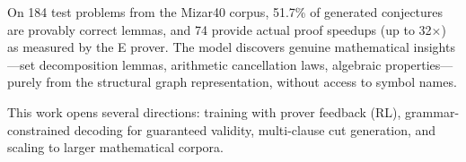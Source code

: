 \documentclass{article}
\begin{document}
On 184 test problems from the Mizar40 corpus, 51.7\% of generated conjectures
are provably correct lemmas, and 74 provide actual proof speedups (up to
32$\times$) as measured by the E prover. The model discovers genuine mathematical
insights---set decomposition lemmas, arithmetic cancellation laws, algebraic
properties---purely from the structural graph representation, without access
to symbol names.

This work opens several directions: training with prover feedback (RL),
grammar-constrained decoding for guaranteed validity, multi-clause cut generation,
and scaling to larger mathematical corpora.


\end{document}
